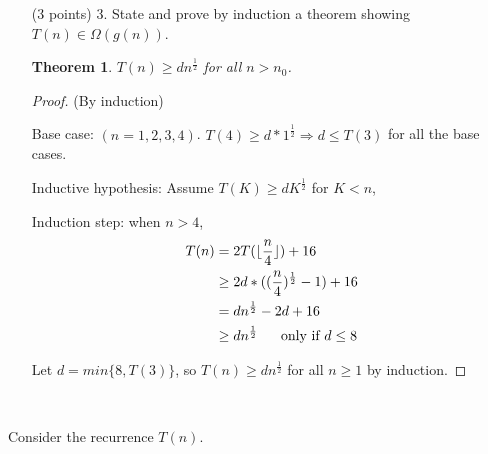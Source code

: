 \documentclass[paper=a4, fontsize=11pt]{scrartcl}
\DeclarePairedDelimiter\floor{\lfloor}{\rfloor}
\newtheorem{theorem}{Theorem}
\numberwithin{equation}{section}		%
\numberwithin{figure}{section}			%
\numberwithin{table}{section}				%
\begin{document}
\begin{enumerate}
\item [(3 points) 3.] State and prove by induction a theorem showing $T(n)\in\Omega(g(n))$.
\begin{theorem}
	$T(n) \geq dn^{\frac{1}{2}}$ for all $n>n_0$.
\end{theorem}
\begin{proof}(By induction)
	
	Base case: $(n = 1,2,3,4)$.
	$T(4) \geq d*1^{\frac{1}{2}} \Rightarrow d \leq T(3)$ for all the base cases.  
	
	Inductive hypothesis: Assume $T(K) \geq dK^{\frac{1}{2}}$ for $K<n$,
	
	Induction step: when $n>4$,
	\begin{align*}
	T(n) &= 2T(\floor{\frac{n}{4}}) + 16 \\
	&\geq 2d*((\frac{n}{4})^{\frac{1}{2}} - 1) + 16 \\
	&= dn^{\frac{1}{2}} -2d + 16 \\
	&\geq dn^{\frac{1}{2}} \ \ \ \ \text{ only if } d \leq 8
	\end{align*}
	
	Let $d=min\{8,T(3)\}$, so $T(n) \geq dn^{\frac{1}{2}} $ for all $n\geq1$ by induction.
\end{proof}


\end{enumerate}

\

\noindent Consider the recurrence $T(n)$.  
\end{document}
